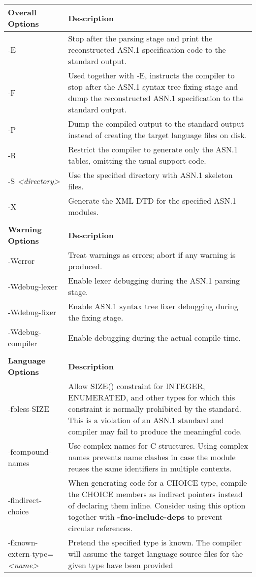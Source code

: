 \documentclass[english,oneside,12pt]{book}
\providecommand{\tabularnewline}{\\}
\begin{document}
\renewcommand{\arraystretch}{1.33}
\begin{longtable}{lp{4in}}
\toprule
\textbf{\small Overall Options} & \textbf{\small Description}\tabularnewline
\midrule
{\small -E} & {\small Stop after the parsing stage and print the reconstructed ASN.1
specification code to the standard output.}\tabularnewline
{\small -F} & {\small Used together with -E, instructs the compiler to stop after
the ASN.1 syntax tree fixing stage and dump the reconstructed ASN.1
specification to the standard output.}\tabularnewline
{\small -P} & {\small Dump the compiled output to the standard output instead of
creating the target language files on disk.}\tabularnewline
{\small -R} & {\small Restrict the compiler to generate only the ASN.1 tables, omitting the usual support code.}\tabularnewline
{\small -S }\emph{\small <directory>} & {\small Use the specified directory with ASN.1 skeleton files.}\tabularnewline
{\small -X} & {\small Generate the XML DTD for the specified ASN.1 modules.}\tabularnewline
\midrule\tabularnewline
\textbf{\small Warning Options} & \textbf{\small Description}\tabularnewline
\midrule
{\small -Werror} & {\small Treat warnings as errors; abort if any warning is produced.}\tabularnewline
{\small -Wdebug-lexer} & {\small Enable lexer debugging during the ASN.1 parsing stage.}\tabularnewline
{\small -Wdebug-fixer} & {\small Enable ASN.1 syntax  tree  fixer  debugging  during  the
 fixing stage.}\tabularnewline
{\small -Wdebug-compiler} & {\small Enable debugging during the actual compile time.}\tabularnewline
\midrule\tabularnewline
\textbf{\small Language Options} & \textbf{\small Description}\tabularnewline
\midrule
{\small -fbless-SIZE} & {\small Allow SIZE() constraint for INTEGER, ENUMERATED, and other
types for which this constraint is normally prohibited by the standard.
This is a violation of an ASN.1 standard and compiler may fail to
produce the meaningful code.}\tabularnewline
{\small -fcompound-names} & {\small Use complex names for C structures. Using complex names prevents
name clashes in case the module reuses the same identifiers in multiple
contexts.}\tabularnewline
{\small -findirect-choice} & {\small When generating code for a CHOICE type, compile the CHOICE
members as indirect pointers instead of declaring them inline. Consider
using this option together with }\textbf{\small -fno-include-deps}{\small{}
to prevent circular references. }\tabularnewline
{\small -fknown-extern-type=}\emph{\small <name>} & {\small Pretend the specified type is known. The compiler will assume
the target language source files for the given type have been provided
}
\end{longtable}
\end{document}
